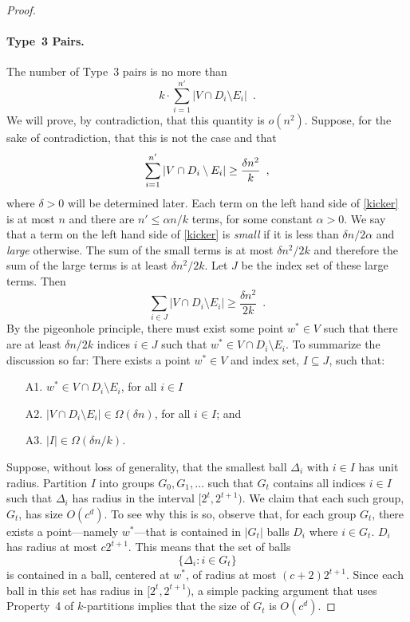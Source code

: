 \documentclass{patmorin}
\begin{document}
\begin{proof}
  \paragraph{Type~3 Pairs.}
  The number of Type~3 pairs is no more than 
  \[  
     k\cdot\sum_{i=1}^{n'}|V\cap D_i\setminus E_i| \enspace .
  \]
  We will prove, by contradiction, that this quantity is $o(n^2)$.
  Suppose, for the sake of contradiction, that this is not the case
  and that
  \begin{equation}
    \sum_{i=1}^{n'} |V\cap D_i\setminus E_i| \ge \frac{\delta n^2}{k}
         \enspace , \eqlabel{kicker}
  \end{equation}
  where $\delta>0$ will be determined later.
  Each term on the left hand side of \eqref{kicker} is at most $n$
  and there are $n'\le \alpha n/k$ terms, for some constant $\alpha
  >0$.  We say that a term on the left hand side of \eqref{kicker} is
  \emph{small} if it is less than $\delta n/2\alpha$ and \emph{large}
  otherwise.  The sum of the small terms is at most $\delta n^2/2k$
  and therefore the sum of the large terms is at least $\delta n^2/2k$.
  Let $J$ be the index set of these large terms.  Then
  \[
    \sum_{i\in J} |V\cap D_i\setminus E_i| \ge \frac{\delta n^2}{2k} \enspace .
  \]
  By the pigeonhole principle, there must exist some point $w^*\in V$
  such that there are at least $\delta n/2k$ indices $i\in J$ such that
  $w^*\in V\cap D_i\setminus E_i$.  To summarize the discussion so far:
  There exists a point $w^*\in V$ and index set, $I\subseteq J$,
  such that:
  \begin{enumerate}
     \item[A1.] $w^*\in V\cap D_{i}\setminus E_{i}$, for all
        $i\in I$
     \item[A2.] $|V\cap D_{i}\setminus E_{i}|\in \Omega(\delta n)$,
       for all $i\in I$; and
     \item[A3.] $|I|\in\Omega(\delta n/k)$.
  \end{enumerate}

  Suppose, without loss of generality, that the smallest ball
  $\Delta_i$ with $i\in I$ has unit radius.  Partition $I$ into groups
  $G_0,G_1,\ldots$ such that $G_t$ contains all indices $i\in I$ such
  that $\Delta_{i}$ has radius in the interval $[2^t,2^{t+1})$.  We claim
  that each such group, $G_t$, has size $O(c^d)$.  To see why this is
  so, observe that, for each group $G_t$, there exists a point---namely
  $w^*$---that is contained in $|G_t|$ balls $D_{i}$ where $i\in G_t$.
  $D_{i}$ has radius at most $c2^{t+1}$.  This means that the set of balls
  \[
     \{ \Delta_i : i\in G_t\}
  \]
  is contained in a ball, centered at $w^*$, of radius at most
  $(c+2)2^{t+1}$.  Since each ball in this set has radius in
  $[2^t,2^{t+1})$, a simple packing argument that uses Property~4 of
  $k$-partitions implies that the size of $G_t$ is $O(c^d)$.


\end{proof}
\end{document}
